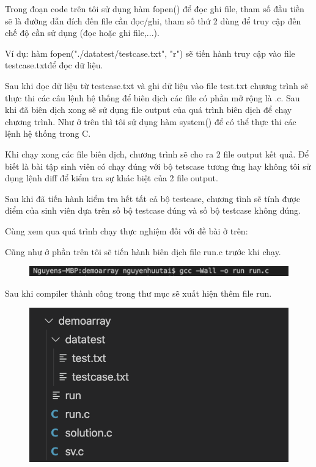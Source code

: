 \documentclass[12pt,a4paper]{article}
\begin{document}
Trong đoạn code trên tôi sử dụng hàm fopen() để đọc ghi file, tham số đầu tiền sẽ là đường dẫn đích đến file cần đọc/ghi, tham số thứ 2 dùng để truy cập đến chế độ cần sử dụng (đọc hoặc ghi file,...).

Ví dụ: hàm fopen("./datatest/testcase.txt", "r") sẽ tiến hành truy cập vào file testcase.txtđể đọc dữ liệu.

Sau khi dọc dữ liệu từ testcase.txt và ghi dữ liệu vào file test.txt chương trình sẽ thực thi các câu lệnh hệ thống để biên dịch các file có phần mở rộng là .c. Sau khi đã biên dịch xong sẽ sử dụng file output của quá trình biên dịch để chạy chương trình. Như ở trên thì tôi sử dụng hàm system() để có thể thực thi các lệnh hệ thống trong C.

Khi chạy xong các file biên dịch, chương trình sẽ cho ra 2 file output kết quả. Để biết là bài tập sinh viên có chạy đúng với bộ tetscase tương ứng hay không tôi sử dụng lệnh diff để kiểm tra sự khác biệt của 2 file output.

Sau khi đã tiến hành kiểm tra hết tất cả bộ testcase, chương tình sẽ tính được điểm của sinh viên dựa trên số bộ testcase đúng và số bộ testcase không đúng.

Cùng xem qua quá trình chạy thực nghiệm đối với đề bài ở trên:

Cũng như ở phần trên tôi sẽ tiến hành biên dịch file run.c trước khi chạy.

\begin{figure}[ht]
\begin{center}
\includegraphics[scale=.4]{hinhanh/compilerdemoarray.png}
\end{center}
\end{figure}

Sau khi compiler thành công trong thư mục sẽ xuất hiện thêm file run.

\begin{figure}[ht]
\begin{center}
\includegraphics[scale=.4]{hinhanh/cautrucarraysaucompiler.png}
\end{center}
\end{figure}
\end{document}
